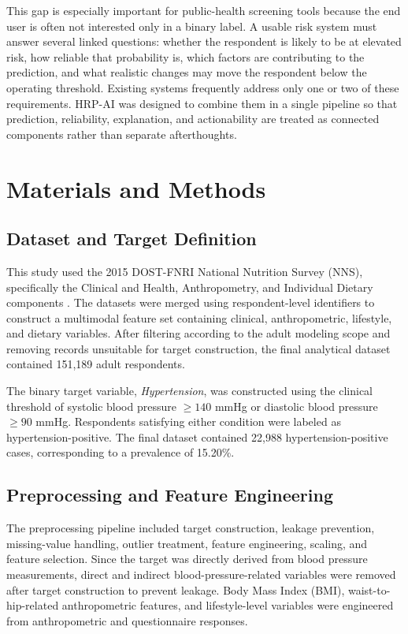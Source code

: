 \documentclass[journal]{IEEEtran}
\begin{document}
This gap is especially important for public-health screening tools because the end user is often not interested only in a binary label. A usable risk system must answer several linked questions: whether the respondent is likely to be at elevated risk, how reliable that probability is, which factors are contributing to the prediction, and what realistic changes may move the respondent below the operating threshold. Existing systems frequently address only one or two of these requirements. HRP-AI was designed to combine them in a single pipeline so that prediction, reliability, explanation, and actionability are treated as connected components rather than separate afterthoughts.

\section{Materials and Methods}

\subsection{Dataset and Target Definition}
This study used the 2015 DOST-FNRI National Nutrition Survey (NNS), specifically the Clinical and Health, Anthropometry, and Individual Dietary components \cite{nnsClinical2015}. The datasets were merged using respondent-level identifiers to construct a multimodal feature set containing clinical, anthropometric, lifestyle, and dietary variables. After filtering according to the adult modeling scope and removing records unsuitable for target construction, the final analytical dataset contained 151,189 adult respondents.

The binary target variable, \emph{Hypertension}, was constructed using the clinical threshold of systolic blood pressure $\geq 140$ mmHg or diastolic blood pressure $\geq 90$ mmHg. Respondents satisfying either condition were labeled as hypertension-positive. The final dataset contained 22,988 hypertension-positive cases, corresponding to a prevalence of 15.20\%.

\subsection{Preprocessing and Feature Engineering}
The preprocessing pipeline included target construction, leakage prevention, missing-value handling, outlier treatment, feature engineering, scaling, and feature selection. Since the target was directly derived from blood pressure measurements, direct and indirect blood-pressure-related variables were removed after target construction to prevent leakage. Body Mass Index (BMI), waist-to-hip-related anthropometric features, and lifestyle-level variables were engineered from anthropometric and questionnaire responses.
\end{document}

